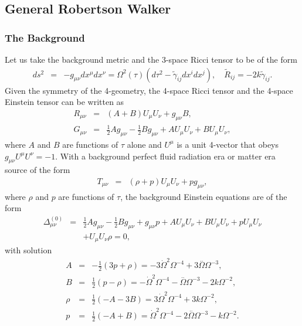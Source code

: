 \subsection{General Robertson Walker}
\label{ss:general_rw_SVT4}

\subsubsection{The Background}
\label{sss:the_background_svt4_rw}

Let us take the background metric and the 3-space Ricci tensor to be of the form 
%
\begin{eqnarray}
ds^2 &=&-g_{\mu\nu}dx^{\mu}dx^{\nu}=\Omega^2(\tau)\left(d\tau^2 -\tilde{\gamma}_{ij} dx^i dx^j\right),\quad \tilde{R}_{ij} = -2k \tilde{\gamma}_{ij}.
\label{12.1}
\end{eqnarray}
%
Given the symmetry of the 4-geometry, the 4-space Ricci tensor and the 4-space Einstein tensor can be written as 
%
\begin{eqnarray}
R_{\mu\nu} &=& (A+B)U_\mu U_\nu + g_{\mu\nu}B,
\nonumber\\
G_{\mu\nu}&=& \tfrac{1}{2} A g_{\mu \nu } -  \tfrac{1}{2} B g_{\mu \nu } + A U_{\mu } U_{\nu } + B U_{\mu } U_{\nu },
\label{12.2}
\end{eqnarray}
%
where $A$ and $B$ are functions of $\tau$ alone and $U^{\mu}$ is a unit 4-vector that obeys $g_{\mu\nu}U^{\mu}U^{\nu}=-1$. With a background perfect fluid radiation era or matter era source of the form
%
\begin{eqnarray} 
T_{\mu\nu} &=& (\rho+p)U_\mu U_\nu +  p g_{\mu\nu},
\label{12.3}
\end{eqnarray}
%
where $\rho$ and $p$ are functions of $\tau$, the background Einstein equations are of the form
%
\begin{eqnarray}
\Delta_{\mu\nu}^{(0)}&=&\tfrac{1}{2} A g_{\mu \nu } -  \tfrac{1}{2} B g_{\mu \nu } + g_{\mu \nu } p + A U_{\mu } U_{\nu } + B U_{\mu } U_{\nu } + p U_{\mu } U_{\nu } 
\nonumber\\
&&+ U_{\mu } U_{\nu } \rho=0,
\label{12.4}
\end{eqnarray}
%
with solution 
%
\begin{eqnarray}
A &=& -\tfrac{1}{2} (3p+\rho)= -3 \dot{\Omega}^2 \Omega^{-4} + 3 \overset{..}{\Omega} \Omega^{-3}, 
\nonumber\\
B&=& \tfrac{1}{2}(p-\rho)=- \dot{\Omega}^2 \Omega^{-4} -  \overset{..}{\Omega} \Omega^{-3} - 2 k \Omega^{-2}, 
\nonumber\\
\rho &=& \tfrac{1}{2} (- A - 3 B)= 3 \dot{\Omega}^2 \Omega^{-4} + 3 k \Omega^{-2},
\nonumber\\
 p &=& \tfrac{1}{2} (- A + B)
= \dot{\Omega}^2 \Omega^{-4} - 2 \overset{..}{\Omega} \Omega^{-3} -  k \Omega^{-2}.
\label{12.5}
\end{eqnarray}
%

